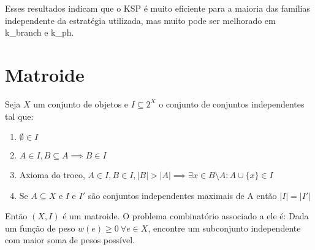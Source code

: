 Esses resultados indicam que o KSP é muito eficiente para a maioria das famílias independente da estratégia utilizada, mas muito pode ser melhorado em k\_branch e k\_ph.


\section{Matroide}
Seja $X$ um conjunto de objetos e $I \subseteq 2^X$ o conjunto de conjuntos independentes tal que:
\begin{enumerate}
	\item $\emptyset \in I$
	\item $A \in I, B \subseteq A \implies B \in I$
	\item Axioma do troco, $A \in I, B \in I, |B| > |A| \implies \exists x \in B \setminus A : A \cup \{x\} \in I$
	\item Se $A \subseteq X$ e $I$ e $I'$ são conjuntos independentes maximais de A então $|I| = |I'|$
\end{enumerate}
Então $(X, I)$ é um matroide. O problema combinatório associado a ele é: Dada um função de peso $w(e) \geq 0 ~\forall e \in X$, encontre um subconjunto independente com maior soma de pesos possível.
